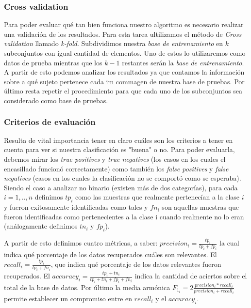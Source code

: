 \subsubsection*{Cross validation} 
\par Para poder evaluar qu\'e tan bien funciona nuestro algoritmo es necesario realizar una validaci\'on de los resultados. Para esta tarea ultilizamos el
m\'etodo de \textit{Cross validation} llamado \textit{k-fold}. Subdividimos nuestra \textit{base de entrenamiento} en $k$ subconjuntos con igual cantidad
de elementos. Uno de estos lo utilizaremos como datos de prueba mientras que los $k-1$ restantes ser\'an la \textit{base de entrenamiento}. A partir de esto
podemos analizar los resultados ya que contamos la informaci\'on sobre a qu\'e sujeto pertenece cada im commagen de nuestra base de pruebas. Por \'ultimo resta repetir
el procedimiento para que cada uno de los subconjuntos sea considerado como base de pruebas.

\subsubsection*{Criterios de evaluaci\'on}
Resulta de vital importancia tener en claro cu\'ales son los criterios a tener en cuenta para ver si nuestra clasificaci\'on es "buena" o no.
Para poder evaluarla, debemos mirar los \textit{true positives} y \textit{true negatives} (los casos en los cuales el encasillado funcion\'o correctamente)
como tambi\'en los \textit{false positives} y \textit{false negatives} (casos en los cuales la clasificaci\'on no se comport\'o como se esperaba).\\
Siendo el caso a analizar no binario (existen m\'as de dos categor\'ias), para cada $i = 1,..,n$  definimos $tp_i$ como
las muestras que realmente pertenec\'ian a la clase $i$ y fueron exitosamente identificadas como tales
y $fn_i$ son aquellas muestras que fueron identificadas como pertenecientes a la clase i cuando realmente no lo eran (an\'alogamente definimos $tn_i$ y $fp_i$).
\par A partir de esto definimos cuatro m\'etricas, a saber:
$precision_i= \frac{tp_i}{tp_i + fp_i}$ la cual indica qu\'e porcentaje de los datos recuperados cu\'ales son relevantes. 
El $recall_i= \frac{tp_i}{tp_i + fn_i}$, que indica qu\'e porcentaje de los datos relevantes fueron recuperados.
El $accuracy_i = \frac{tp_i+tn_i}{tp_i + tn_i + fp_i + fn_i}$ indica la cantidad de aciertos sobre el total de la base de datos.
Por \'ultimo la media arm\'onica $F_{1_i} = 2\frac{precision_i * recall_i}{precision_i + recall_i}$ permite establecer un compromiso entre en 
$recall_i$ y el $accuracy_i$.